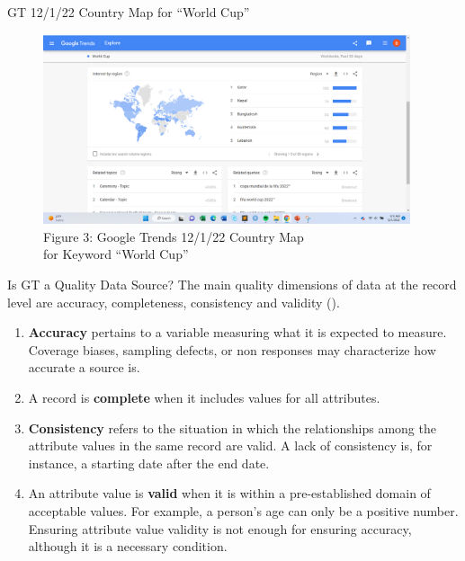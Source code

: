\documentclass[pdf]{beamer}
\newcommand{\empr}[1]{{\color{franklinblue}\textbf{#1}}}
\theoremstyle{remark}
\theoremstyle{definition}
\begin{document}
\begin{frame}[t]{GT 12/1/22 Country Map for ``World Cup''}
\begin{figure}[htbp]
  \captionsetup{justification=centering}
  \includegraphics[height=5.6cm, trim=0.0cm 0.0cm 0.0cm 0.0cm width=5.6cm]{Images/Google_Trends_3_120122.png}
  \caption{Figure {\color{franklinblue} 3}: Google Trends 12/1/22 Country Map \\ for Keyword ``World Cup''}
\end{figure}
\end{frame}

\begin{frame}[t]{Is GT a Quality Data Source?}
The main quality dimensions of data at the record level are accuracy, completeness, consistency and validity (\cite{karr2006}). \\
\vspace{1.5ex}
\small
\begin{enumerate}
  \item \empr{Accuracy} pertains to a variable measuring what it is expected to measure. Coverage biases, sampling defects, or non responses may characterize how accurate a source is.
  \item A record is \empr{complete} when it includes values for all attributes.
  \item \empr{Consistency} refers to the situation in which the relationships among the attribute values in the same record are valid. A lack of consistency is, for instance, a starting date after the end date. 
  \item An attribute value is \empr{valid} when it is within a pre-established domain of acceptable values. For example, a person's age can only be a positive number. Ensuring attribute value validity is not enough for ensuring accuracy, although it is a necessary condition.
\end{enumerate}
\end{frame}
\end{document}
